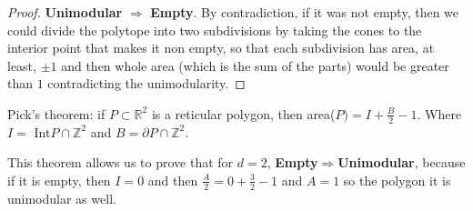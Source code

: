 \begin{proof}
\textbf{Unimodular} $\Rightarrow$ \textbf{Empty}. By contradiction, if it was not empty, then we could divide the polytope into two subdivisions by taking the cones to the interior point that makes it non empty, so that each subdivision has area, at least, $\pm 1$ and then whole area (which is the sum of the parts) would be greater than $1$ contradicting the unimodularity.
\end{proof}
\begin{theorem}
Pick's theorem: if $P\subset\mathbb{R}^2$ is a reticular polygon, then area($P)=I+\frac{B}{2}-1$. Where $I=$ Int$P\cap\mathbb{Z}^2$ and $B=\partial P\cap\mathbb{Z}^2$.
\end{theorem}

This theorem allows us to prove that for $d=2$, \textbf{Empty}$\Rightarrow$\textbf{Unimodular}, because if it is empty, then $I=0$ and then $\frac{A}{2}=0+\frac{3}{2}-1$ and $A=1$ so the polygon it is unimodular as well.


